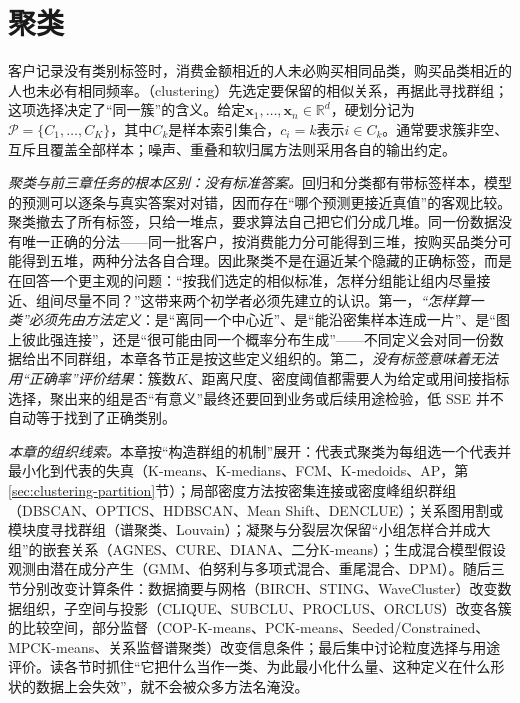 \chapter{聚类}
\label{chap:clustering}

\begingroup
\let\clusteringNoteFont\booknotefont
\renewcommand{\booknotefont}{\clusteringNoteFont\color{black}}

客户记录没有类别标签时，消费金额相近的人未必购买相同品类，购买品类相近的人也未必有相同频率。（clustering）先选定要保留的相似关系，再据此寻找群组；这项选择决定了“同一簇”的含义。给定$\bm{x}_1,\ldots,\bm{x}_n\in\mathbb{R}^{d}$，硬划分记为$\mathcal{P}=\{C_1,\ldots,C_K\}$，其中$C_k$是样本索引集合，$c_i=k$表示$i\in C_k$。通常要求簇非空、互斥且覆盖全部样本；噪声、重叠和软归属方法则采用各自的输出约定。

\emph{聚类与前三章任务的根本区别：没有标准答案。}回归和分类都有带标签样本，模型的预测可以逐条与真实答案对对错，因而存在“哪个预测更接近真值”的客观比较。聚类撤去了所有标签，只给一堆点，要求算法自己把它们分成几堆。同一份数据没有唯一正确的分法——同一批客户，按消费能力分可能得到三堆，按购买品类分可能得到五堆，两种分法各自合理。因此聚类不是在逼近某个隐藏的正确标签，而是在回答一个更主观的问题：“按我们选定的相似标准，怎样分组能让组内尽量接近、组间尽量不同？”这带来两个初学者必须先建立的认识。第一，\emph{“怎样算一类”必须先由方法定义}：是“离同一个中心近”、是“能沿密集样本连成一片”、是“图上彼此强连接”，还是“很可能由同一个概率分布生成”——不同定义会对同一份数据给出不同群组，本章各节正是按这些定义组织的。第二，\emph{没有标签意味着无法用“正确率”评价结果}：簇数$K$、距离尺度、密度阈值都需要人为给定或用间接指标选择，聚出来的组是否“有意义”最终还要回到业务或后续用途检验，低 SSE 并不自动等于找到了正确类别。

\emph{本章的组织线索。}本章按“构造群组的机制”展开：代表式聚类为每组选一个代表并最小化到代表的失真（K-means、K-medians、FCM、K-medoids、AP，第\ref{sec:clustering-partition}节）；局部密度方法按密集连接或密度峰组织群组（DBSCAN、OPTICS、HDBSCAN、Mean Shift、DENCLUE）；关系图用割或模块度寻找群组（谱聚类、Louvain）；凝聚与分裂层次保留“小组怎样合并成大组”的嵌套关系（AGNES、CURE、DIANA、二分K-means）；生成混合模型假设观测由潜在成分产生（GMM、伯努利与多项式混合、重尾混合、DPM）。随后三节分别改变计算条件：数据摘要与网格（BIRCH、STING、WaveCluster）改变数据组织，子空间与投影（CLIQUE、SUBCLU、PROCLUS、ORCLUS）改变各簇的比较空间，部分监督（COP-K-means、PCK-means、Seeded/Constrained、MPCK-means、关系监督谱聚类）改变信息条件；最后集中讨论粒度选择与用途评价。读各节时抓住“它把什么当作一类、为此最小化什么量、这种定义在什么形状的数据上会失效”，就不会被众多方法名淹没。

